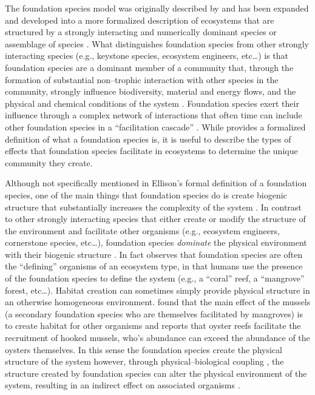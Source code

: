 \documentclass{article}
\begin{document}
The foundation species model was originally described by  and has been expanded and developed into a more formalized description of ecosystems that are structured by a strongly interacting and numerically dominant species or assemblage of species \cite{ellison_foundation_2019}. What distinguishes foundation species from other strongly interacting species (e.g., keystone species, ecosystem engineers, etc\ldots) is that foundation species are a dominant member of a community that, through the formation of substantial non--trophic interaction with other species in the community, strongly influence biodiversity, material and energy flows, and the physical and chemical conditions of the system \cite{ellison_foundation_2019}. Foundation species exert their influence through a complex network of interactions that often time can include other foundation species in a ``facilitation cascade'' \cite{angelini_interactions_2011, ellison_foundation_2019, vozzo_cooccuring_2019}. While  provides a formalized definition of what a foundation species is, it is useful to describe the types of effects that foundation species facilitate in ecosystems to determine the unique community they create. 

Although not specifically mentioned in Ellison's formal definition of a foundation species, one of the main things that foundation species do is create biogenic structure that substantially increases the complexity of the system \cite{lenihan_physicalbiological_1999, ellison_loss_2005, ellison_foundation_2019, vozzo_co-occuring_2019, fields_foundation_2022, searles_oyster_2022}. In contrast to other strongly interacting species that either create or modify the structure of the environment and facilitate other organisms (e.g., ecosystem engineers, cornerstone species, etc\ldots), foundation species \emph{dominate} the physical environment with their biogenic structure \cite{ellison_foundation_2019}. In fact  observes that foundation species are often the ``defining'' organisms of an ecosystem type, in that humans use the presence of the foundation species to define the system (e.g., a ``coral'' reef, a ``mangrove'' forest, etc\ldots). Habitat creation can sometimes simply provide physical structure in an otherwise homogeneous environment.  found that the main effect of the mussels (a secondary foundation species who are themselves facilitated by mangroves) is to create habitat for other organisms and  reports that oyster reefs facilitate the recruitment of hooked mussels, who's abundance can exceed the abundance of the oysters themselves. In this sense the foundation species create the physical structure of the system however, through physical--biological coupling \cite{lenihan_physicalbiological_1999}, the structure created by foundation species can alter the physical environment of the system, resulting in an indirect effect on associated organisms \cite{searles_oyster_2022}. 
\end{document}
